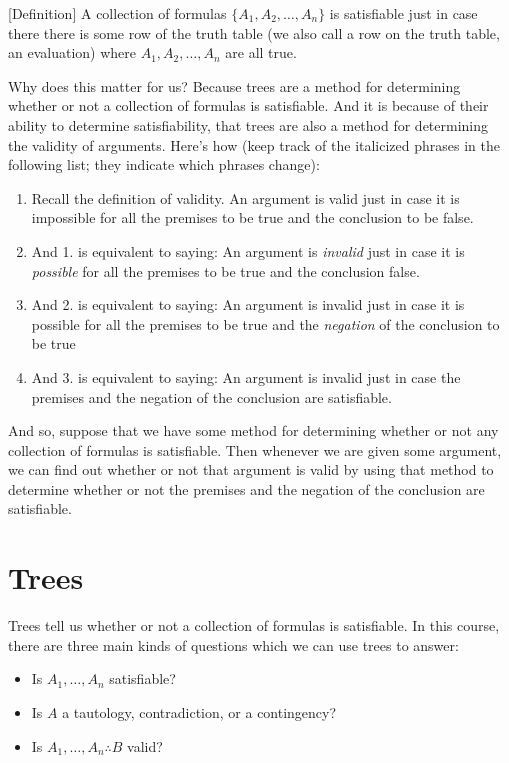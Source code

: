 \documentclass[
]{book}
\providecommand{\tightlist}{%
  \setlength{\itemsep}{0pt}\setlength{\parskip}{0pt}}
\begin{document}
{[}Definition{]} A collection of formulas \(\{A_1,A_2,\ldots,A_n\}\) is satisfiable just in case there there is some row of the truth table (we also call a row on the truth table, an evaluation) where \(A_1,A_2,\ldots,A_n\) are all true.

Why does this matter for us? Because trees are a method for determining whether or not a collection of formulas is satisfiable. And it is because of their ability to determine satisfiability, that trees are also a method for determining the validity of arguments. Here's how (keep track of the italicized phrases in the following list; they indicate which phrases change):

\begin{enumerate}
\def\labelenumi{\arabic{enumi}.}
\tightlist
\item
  Recall the definition of validity. An argument is valid just in case it is impossible for all the premises to be true and the conclusion to be false.
\item
  And 1. is equivalent to saying: An argument is \emph{invalid} just in case it is \emph{possible} for all the premises to be true and the conclusion false.
\item
  And 2. is equivalent to saying: An argument is invalid just in case it is possible for all the premises to be true and the \emph{negation} of the conclusion to be true
\item
  And 3. is equivalent to saying: An argument is invalid just in case the premises and the negation of the conclusion are satisfiable.
\end{enumerate}

And so, suppose that we have some method for determining whether or not any collection of formulas is satisfiable. Then whenever we are given some argument, we can find out whether or not that argument is valid by using that method to determine whether or not the premises and the negation of the conclusion are satisfiable.

\hypertarget{trees}{%
\section{Trees}\label{trees}}

Trees tell us whether or not a collection of formulas is satisfiable. In this course, there are three main kinds of questions which we can use trees to answer:

\begin{itemize}
\tightlist
\item
  Is \(A_1,\ldots,A_n\) satisfiable?
\item
  Is \(A\) a tautology, contradiction, or a contingency?
\item
  Is \(A_1,\ldots,A_n \therefore B\) valid?
\end{itemize}
\end{document}
